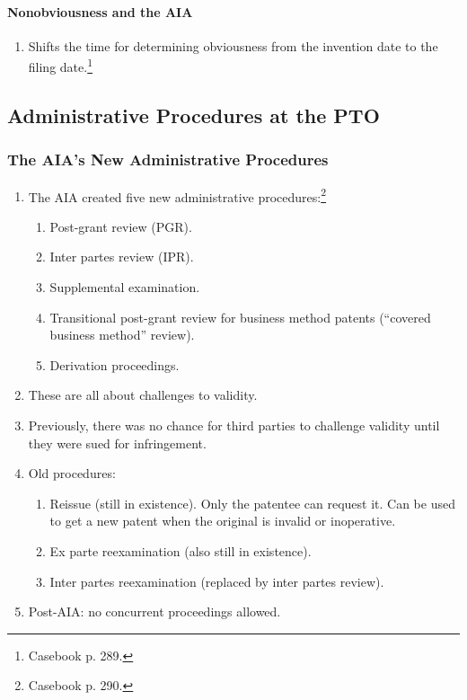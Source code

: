 \paragraph{Nonobviousness and the AIA}

\begin{enumerate}
    \item Shifts the time for determining obviousness from the invention date 
    to the filing date.\footnote{Casebook p. 289.}
\end{enumerate}

\subsection{Administrative Procedures at the PTO}

\subsubsection{The AIA's New Administrative Procedures}

\begin{enumerate}
    \item The AIA created five new administrative 
    procedures:\footnote{Casebook p. 290.}
    \begin{enumerate}
        \item Post-grant review (PGR).
        \item Inter partes review (IPR).
        \item Supplemental examination.
        \item Transitional post-grant review for business method patents 
        (``covered business method'' review).
        \item Derivation proceedings.
    \end{enumerate}
    \item These are all about challenges to validity.
    \item Previously, there was no chance for third parties to challenge 
    validity until they were sued for infringement.
    \item Old procedures:
    \begin{enumerate}
        \item Reissue (still in existence). Only the patentee can request it. 
        Can be used to get a new patent when the original is invalid or 
        inoperative.
        \item Ex parte reexamination (also still in existence).
        \item Inter partes reexamination (replaced by inter partes review).
    \end{enumerate}
    \item Post-AIA: no concurrent proceedings allowed.
\end{enumerate}

